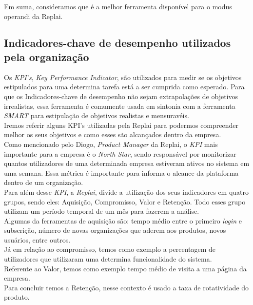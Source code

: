 Em suma, consideramos que é a melhor ferramenta disponível para o modus operandi da Replai.

\subsection{Indicadores-chave de desempenho utilizados pela organização}
Os \textit{KPI's}, \textit{Key Performance Indicator}, são utilizados para medir se os objetivos estipulados para uma determina tarefa está a ser cumprida como esperado\cite{KPI}. Para que os Indicadores-chave de desempenho não sejam extrapolações de objetivos irrealistas, essa ferramenta é comumente usada em sintonia com a ferramenta \textit{SMART} para estipulação de objetivos realistas e mensuravéis.\\

Iremos referir alguns KPI's utilizadas pela Replai para podermos compreender melhor os seus objetivos e como esses são alcançados dentro da empresa.\\

Como mencionado pelo Diogo, \textit{Product Manager} da Replai, o \textit{KPI} mais importante para a empresa é o \textit{North Star}, sendo responsável por monitorizar quantos utilizadores de uma determinada empresa estiveram ativos no sistema em uma semana. Essa métrica é importante para informa o alcance da plataforma dentro de um organização.\\

Para além desse \textit{KPI}, a \textit{Replai}, divide a utilização dos seus indicadores em quatro grupos, sendo eles: Aquisição, Compromisso, Valor e Retenção. Todo esses grupo utilizam um período temporal de um mês para fazerem a análise.\\

Algumas da ferramentas de aquisição são: tempo médio entre o primeiro \textit{login} e subscrição, número de novas organizações que aderem aos produtos, novos usuários, entre outros.\\

Já em relação ao compromisso, temos como exemplo a percentagem de utilizadores que utilizaram uma determina funcionalidade do sistema.\\

Referente ao Valor, temos como exemplo tempo médio de visita a uma página da empresa.\\

Para concluir temos a Retenção, nesse contexto é usado a taxa de rotatividade do produto.\\

